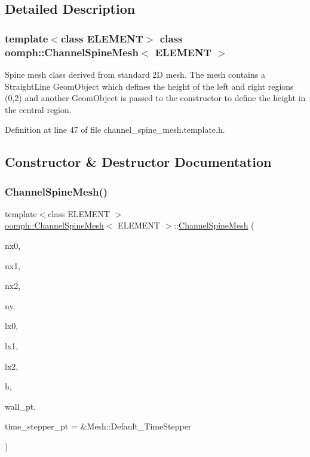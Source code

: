 \subsection{Detailed Description}
\subsubsection*{template$<$class E\+L\+E\+M\+E\+NT$>$\newline
class oomph\+::\+Channel\+Spine\+Mesh$<$ E\+L\+E\+M\+E\+N\+T $>$}

Spine mesh class derived from standard 2D mesh. The mesh contains a Straight\+Line Geom\+Object which defines the height of the left and right regions (0,2) and another Geom\+Object is passed to the constructor to define the height in the central region. 

Definition at line 47 of file channel\+\_\+spine\+\_\+mesh.\+template.\+h.



\subsection{Constructor \& Destructor Documentation}
\mbox{\label{classoomph_1_1ChannelSpineMesh_a9f8cdd0476807b44bccb7b1ae6f97a4a}} 
\subsubsection{\texorpdfstring{Channel\+Spine\+Mesh()}{ChannelSpineMesh()}\hspace{0.1cm}{\footnotesize\ttfamily [1/2]}}
{\footnotesize\ttfamily template$<$class E\+L\+E\+M\+E\+NT $>$ \\
\hyperlink{classoomph_1_1ChannelSpineMesh}{oomph\+::\+Channel\+Spine\+Mesh}$<$ E\+L\+E\+M\+E\+NT $>$\+::\hyperlink{classoomph_1_1ChannelSpineMesh}{Channel\+Spine\+Mesh} (\begin{DoxyParamCaption}\item[{const unsigned \&}]{nx0,  }\item[{const unsigned \&}]{nx1,  }\item[{const unsigned \&}]{nx2,  }\item[{const unsigned \&}]{ny,  }\item[{const double \&}]{lx0,  }\item[{const double \&}]{lx1,  }\item[{const double \&}]{lx2,  }\item[{const double \&}]{h,  }\item[{Geom\+Object $\ast$}]{wall\+\_\+pt,  }\item[{Time\+Stepper $\ast$}]{time\+\_\+stepper\+\_\+pt = {\ttfamily \&Mesh\+:\+:Default\+\_\+TimeStepper} }\end{DoxyParamCaption})}



